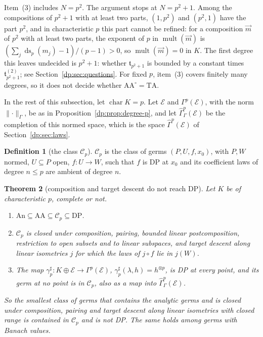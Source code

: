 \documentclass[11pt]{amsart}
\newtheorem{theorem}{Theorem}[section]
\theoremstyle{definition}
\newtheorem{definition}[theorem]{Definition}
\theoremstyle{remark}
\numberwithin{equation}{section}
\newcommand{\norm}[1]{\lVert #1\rVert}
\newcommand{\cC}{\mathcal{C}}
\theoremstyle{plain}
\theoremstyle{definition}
\theoremstyle{plain}
\newcommand{\hGamma}{\widehat\Gamma}
\begin{document}
Item~(3) includes $N=p^2$. The argument stops at $N=p^2+1$. Among the compositions of $p^2+1$ with at least two parts, $(1,p^2)$ and $(p^2,1)$ have the part $p^2$, and in characteristic $p$ this part cannot be refined: for a composition $\vec m$ of $p^2$ with at least two parts, the exponent of $p$ in $\operatorname{mult}(\vec m)$ is $(\sum_j\operatorname{ds}_p(m_j)-1)/(p-1)>0$, so $\operatorname{mult}(\vec m)=0$ in $K$. The first degree this leaves undecided is $p^2+1$: whether $\mathfrak t_{p^2+1}$ is bounded by a constant times $\mathfrak t^{(2)}_{p^2+1}$; see Section~\ref{dp:sec:questions}. For fixed $p$, item~(3) covers finitely many degrees, so it does not decide whether $\mathrm{AA}^\circ=\mathrm{TA}$.

In the rest of this subsection, let $\operatorname{char}K=p$. Let $\mathcal E$ and $\Gamma^p(\mathcal E)$, with the norm $\norm\cdot_\Gamma$, be as in Proposition~\ref{dp:prop:degree-p}, and let $\hGamma^p_\Gamma(\mathcal E)$ be the completion of this normed space, which is the space $\hGamma^p(\mathcal E)$ of Section~\ref{dp:sec:laws}.

\begin{definition}[the class $\cC_p$]\label{dp:def:cp}
$\cC_p$ is the class of germs $(P,U,f,x_0)$, with $P,W$ normed, $U\subseteq P$ open, $f\colon U\to W$, such that $f$ is DP at $x_0$ and its coefficient laws of degree $n\le p$ are ambient of degree $n$.
\end{definition}

\begin{theorem}[composition and target descent do not reach DP]\label{dp:thm:cp}
Let $K$ be of characteristic $p$, complete or not.
\begin{enumerate}
\item $\mathrm{An}\subseteq\mathrm{AA}\subseteq\cC_p\subseteq\mathrm{DP}$.
\item $\cC_p$ is closed under composition, pairing, bounded linear postcomposition, restriction to open subsets and to linear subspaces, and target descent along linear isometries $j$ for which the laws of $j\circ f$ lie in $j(W)$.
\item The map $\gamma^\sharp_p\colon K\oplus\mathcal E\to\Gamma^p(\mathcal E)$, $\gamma^\sharp_p(\lambda,h)=h^{\otimes p}$, is DP at every point, and its germ at no point is in $\cC_p$, also as a map into $\hGamma^p_\Gamma(\mathcal E)$.
\end{enumerate}
So the smallest class of germs that contains the analytic germs and is closed under composition, pairing and target descent along linear isometries with closed range is contained in $\cC_p$ and is not DP. The same holds among germs with Banach values.
\end{theorem}
\end{document}
